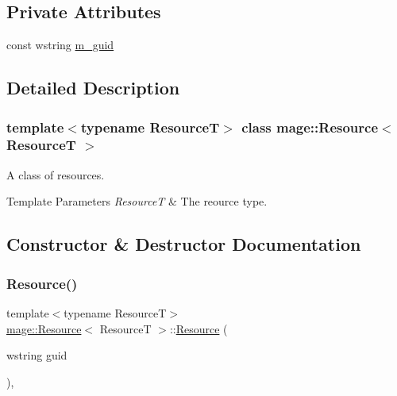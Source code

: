 \subsection*{Private Attributes}
\begin{DoxyCompactItemize}
\item 
const wstring \hyperlink{classmage_1_1_resource_ad2924d9bc9ddecf06475b52a8c7065d8}{m\+\_\+guid}
\end{DoxyCompactItemize}


\subsection{Detailed Description}
\subsubsection*{template$<$typename ResourceT$>$\newline
class mage\+::\+Resource$<$ Resource\+T $>$}

A class of resources.


\begin{DoxyTemplParams}{Template Parameters}
{\em ResourceT} & The reource type. \\
\hline
\end{DoxyTemplParams}


\subsection{Constructor \& Destructor Documentation}
\hypertarget{classmage_1_1_resource_a397a81a1195dea231776db9787cad52d}{}\label{classmage_1_1_resource_a397a81a1195dea231776db9787cad52d} 
\subsubsection{\texorpdfstring{Resource()}{Resource()}\hspace{0.1cm}{\footnotesize\ttfamily [1/3]}}
{\footnotesize\ttfamily template$<$typename ResourceT$>$ \\
\hyperlink{classmage_1_1_resource}{mage\+::\+Resource}$<$ ResourceT $>$\+::\hyperlink{classmage_1_1_resource}{Resource} (\begin{DoxyParamCaption}\item[{wstring}]{guid }\end{DoxyParamCaption})\hspace{0.3cm}{\ttfamily [explicit]}, {\ttfamily [noexcept]}}

